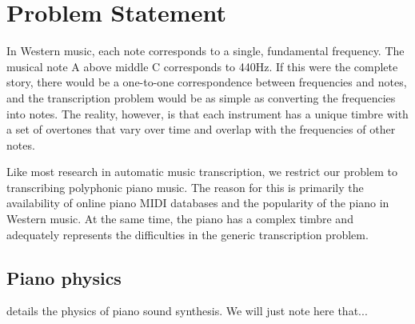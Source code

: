 \documentclass[5p]{elsarticle}
\begin{document}













\section{Problem Statement}

In Western music, each note corresponds to a single, fundamental frequency. The musical note A above middle C corresponds to 440Hz. If this were the complete story, there would be a one-to-one correspondence between frequencies and notes, and the transcription problem would be as simple as converting the frequencies into notes. The reality, however, is that each instrument has a unique timbre with a set of overtones that vary over time and overlap with the frequencies of other notes.

Like most research in automatic music transcription, we restrict our problem to transcribing polyphonic piano music. The reason for this is primarily the availability of online piano MIDI databases and the popularity of the piano in Western music. At the same time, the piano has a complex timbre and adequately represents the difficulties in the generic transcription problem.

\subsection{Piano physics}

\citet{bank2003physically} details the physics of piano sound synthesis. We will just note here that...
\end{document}
